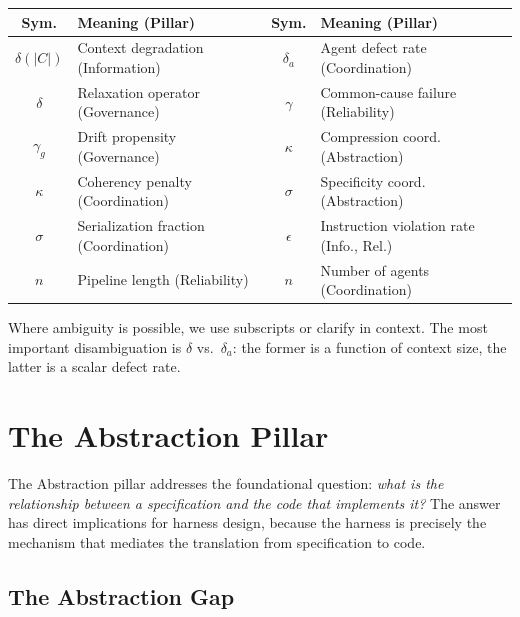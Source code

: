 \documentclass[11pt, a4paper]{googledeepmind}
\begin{document}
\begin{center}
\footnotesize
\begin{tabular}{cp{5.5cm}cp{5.5cm}}
\toprule
\textbf{Sym.} & \textbf{Meaning (Pillar)} & \textbf{Sym.} & \textbf{Meaning (Pillar)} \\
\midrule
$\delta(|C|)$ & Context degradation (Information) & $\delta_a$ & Agent defect rate (Coordination) \\
$\delta$ & Relaxation operator (Governance) & $\gamma$ & Common-cause failure (Reliability) \\
$\gamma_g$ & Drift propensity (Governance) & $\kappa$ & Compression coord. (Abstraction) \\
$\kappa$ & Coherency penalty (Coordination) & $\sigma$ & Specificity coord. (Abstraction) \\
$\sigma$ & Serialization fraction (Coordination) & $\epsilon$ & Instruction violation rate (Info., Rel.) \\
$n$ & Pipeline length (Reliability) & $n$ & Number of agents (Coordination) \\
\bottomrule
\end{tabular}
\end{center}
Where ambiguity is possible, we use subscripts or clarify in context. The most important disambiguation is $\delta$ vs.\ $\delta_a$: the former is a function of context size, the latter is a scalar defect rate.


\section{The Abstraction Pillar}
\label{sec:abstraction}

The Abstraction pillar addresses the foundational question: \emph{what is the relationship between a specification and the code that implements it?} The answer has direct implications for harness design, because the harness is precisely the mechanism that mediates the translation from specification to code.

\subsection{The Abstraction Gap}
\end{document}
